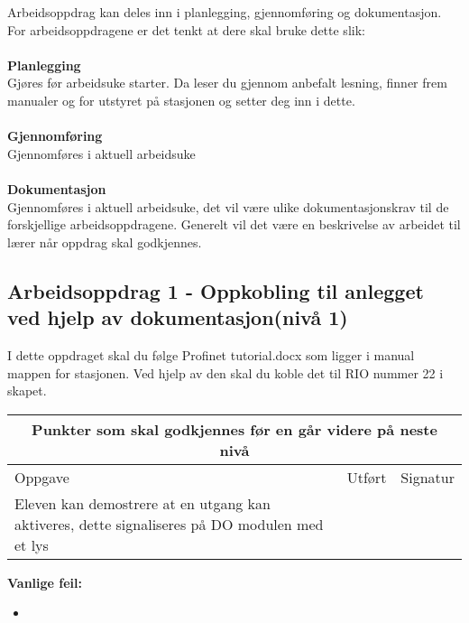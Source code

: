 Arbeidsoppdrag kan deles inn i planlegging, gjennomføring og dokumentasjon.\\
For arbeidsoppdragene er det tenkt at dere skal bruke dette slik:\\\\
\textbf{Planlegging}\\
Gjøres før arbeidsuke starter. Da leser du gjennom anbefalt lesning, finner frem manualer og for  utstyret på stasjonen og setter deg inn i dette.\\ \\
\textbf{Gjennomføring}\\
Gjennomføres i aktuell arbeidsuke\\\\

\textbf{Dokumentasjon}\\
Gjennomføres i aktuell arbeidsuke, det vil være ulike dokumentasjonskrav til de forskjellige arbeidsoppdragene. Generelt vil det være en beskrivelse av arbeidet til lærer når oppdrag skal godkjennes. \\


\newpage

\subsection*{Arbeidsoppdrag 1 -  Oppkobling til anlegget ved hjelp av dokumentasjon(nivå 1)}

I dette oppdraget skal du følge Profinet tutorial.docx som ligger i manual mappen  for stasjonen. Ved hjelp av den skal du koble det til RIO nummer 22 i skapet. 

\begin{center} \begin{tabular}{ | m{12cm} | m{1cm}| m{2cm} | } 
\hline
\multicolumn{3}{|c|}{Punkter som skal godkjennes før en går videre på neste nivå} \\
	\hline
	Oppgave	& Utført & Signatur \\ 
	\hline
Eleven kan demostrere at en utgang kan aktiveres, dette signaliseres på DO modulen med et lys& & \\ 
	\hline
\end{tabular}
\end{center}

\textbf{Vanlige feil:}
\begin{itemize}[noitemsep]
	\item 
\end{itemize}
\newpage
